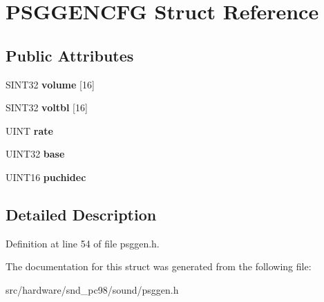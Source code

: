 \hypertarget{structPSGGENCFG}{\section{P\-S\-G\-G\-E\-N\-C\-F\-G Struct Reference}
\label{structPSGGENCFG}
}
\subsection*{Public Attributes}
\begin{DoxyCompactItemize}
\item 
\hypertarget{structPSGGENCFG_ade9c4e2a47cd2f15d6f7c2ed9eb2a361}{S\-I\-N\-T32 {\bfseries volume} \mbox{[}16\mbox{]}}\label{structPSGGENCFG_ade9c4e2a47cd2f15d6f7c2ed9eb2a361}

\item 
\hypertarget{structPSGGENCFG_a483cebf588dc10d6743f5a6ba1c09c05}{S\-I\-N\-T32 {\bfseries voltbl} \mbox{[}16\mbox{]}}\label{structPSGGENCFG_a483cebf588dc10d6743f5a6ba1c09c05}

\item 
\hypertarget{structPSGGENCFG_a4b963f54846cf18f5abf38082f9f8875}{U\-I\-N\-T {\bfseries rate}}\label{structPSGGENCFG_a4b963f54846cf18f5abf38082f9f8875}

\item 
\hypertarget{structPSGGENCFG_a830f36f61ca4eb60191c96f7ed26a71a}{U\-I\-N\-T32 {\bfseries base}}\label{structPSGGENCFG_a830f36f61ca4eb60191c96f7ed26a71a}

\item 
\hypertarget{structPSGGENCFG_a11c2d47fdb854a8aac7e03c404dfd1d4}{U\-I\-N\-T16 {\bfseries puchidec}}\label{structPSGGENCFG_a11c2d47fdb854a8aac7e03c404dfd1d4}

\end{DoxyCompactItemize}


\subsection{Detailed Description}


Definition at line 54 of file psggen.\-h.



The documentation for this struct was generated from the following file\-:\begin{DoxyCompactItemize}
\item 
src/hardware/snd\-\_\-pc98/sound/psggen.\-h\end{DoxyCompactItemize}
